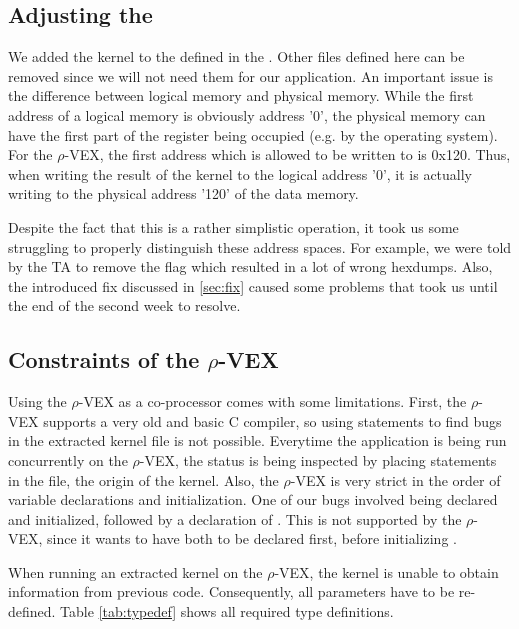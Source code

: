 \subsection{Adjusting the }
We added the kernel to the  defined in the . Other files defined here can be removed since we will not need them for our application. An important issue is the difference between logical memory and physical memory. While the first address of a logical memory is obviously address '0', the physical memory can have the first part of the register being occupied (e.g. by the operating system). For the $\rho$-VEX, the first address which is allowed to be written to is 0x120. Thus, when writing the result of the kernel to the logical address '0', it is  actually writing to the physical address '120' of the data memory. %

Despite the fact that this is a rather simplistic operation, it took us some struggling to properly distinguish these address spaces. For example, we were told by the TA to remove the  flag which resulted in a lot of wrong hexdumps. Also, the introduced fix discussed in \ref{sec:fix} caused some problems that took us until the end of the second week to resolve.

\subsection{Constraints of the $\rho$-VEX}
Using the $\rho$-VEX as a co-processor comes with some limitations. First, the $\rho$-VEX supports a very old and basic C compiler, so using  statements to find bugs in the extracted kernel file is not possible. Everytime the application is being run concurrently on the $\rho$-VEX, the status is being inspected by placing  statements in the  file, the origin of the kernel. Also, the $\rho$-VEX is very strict in the order of variable declarations and initialization. One of our bugs involved  being declared and initialized, followed by a declaration of . This is not supported by the $\rho$-VEX, since it wants to have  both to be declared first, before initializing .

When running an extracted kernel on the $\rho$-VEX, the kernel is unable to obtain information from previous code. Consequently, all parameters have to be re-defined. Table \ref{tab:typedef} shows all required type definitions.

